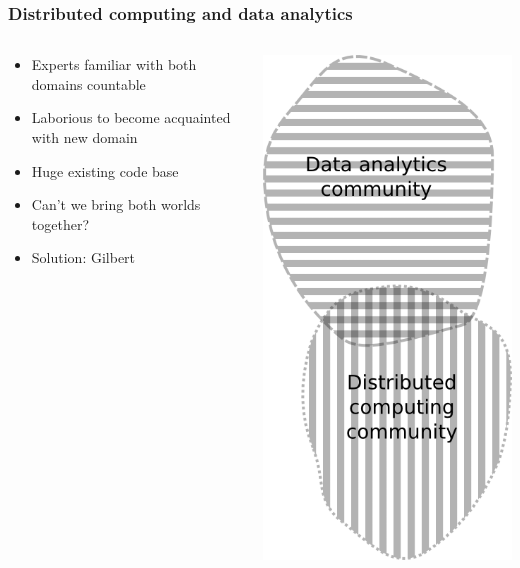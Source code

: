 \begin{frame}
	\frametitle{Distributed computing and data analytics}
	\begin{columns}
		\begin{column}{0.6\textwidth}
			\begin{itemize}
				\item Experts familiar with both domains countable
				\item Laborious to become acquainted with new domain
				\item Huge existing code base
				\item Can't we bring both worlds together?
				\item Solution: Gilbert
			\end{itemize}
		\end{column}
		\begin{column}{0.4\textwidth}
			\includegraphics[height=0.8\textheight]{images/intersection.png}
		\end{column}
	\end{columns}
\end{frame}